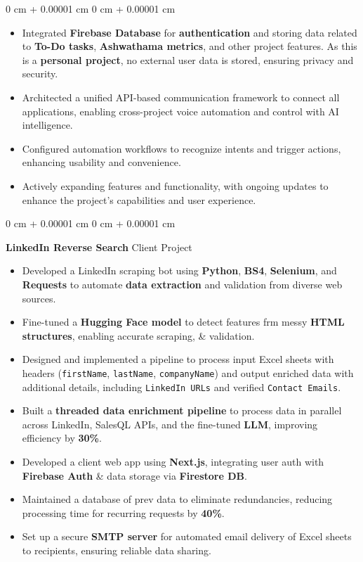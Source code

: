 \documentclass[10pt, letterpaper]{article}
\newenvironment{highlights}{
    \begin{itemize}[
        topsep=0.10 cm,
        parsep=0.10 cm,
        partopsep=0pt,
        itemsep=0pt,
        leftmargin=0 cm + 10pt
    ]
}{
    \end{itemize}
} %
\newenvironment{onecolentry}{
    \begin{adjustwidth}{
        0 cm + 0.00001 cm
    }{
        0 cm + 0.00001 cm
    }
}{
    \end{adjustwidth}
} %
\begin{document}
\begin{onecolentry}
\begin{highlights}
		\item Integrated \textbf{Firebase Database} for \textbf{authentication} and storing data related to \textbf{To-Do tasks}, \textbf{Ashwathama metrics}, and other project features. As this is a \textbf{personal project}, no external user data is stored, ensuring privacy and security.
		\item Architected a unified API-based communication framework to connect all applications, enabling cross-project voice automation and control with AI intelligence.
		\item Configured automation workflows to recognize intents and trigger actions, enhancing usability and convenience.
		\item Actively expanding features and functionality, with ongoing updates to enhance the project's capabilities and user experience.
	\end{highlights}
\end{onecolentry}

\vspace{0.15 cm}

\begin{onecolentry}
	\textbf{LinkedIn Reverse Search} \hfill Client Project
	\begin{highlights}
		\item Developed a LinkedIn scraping bot using \textbf{Python}, \textbf{BS4}, \textbf{Selenium}, and \textbf{Requests} to automate \textbf{data extraction} and validation from diverse web sources.
		\item Fine-tuned a \textbf{Hugging Face model} to detect features frm messy \textbf{HTML structures}, enabling accurate scraping, \& validation.
		\item Designed and implemented a pipeline to process input Excel sheets with headers (\texttt{firstName}, \texttt{lastName}, \texttt{companyName}) and output enriched data with additional details, including \texttt{LinkedIn URLs} and verified \texttt{Contact Emails}.
		\item Built a \textbf{threaded data enrichment pipeline} to process data in parallel across LinkedIn, SalesQL APIs, and the fine-tuned \textbf{LLM}, improving efficiency by \textbf{30\%}.
		\item Developed a client web app using \textbf{Next.js}, integrating user auth with \textbf{Firebase Auth} \& data storage via \textbf{Firestore DB}.
		\item Maintained a database of prev data to eliminate redundancies, reducing processing time for recurring requests by \textbf{40\%}.
		\item Set up a secure \textbf{SMTP server} for automated email delivery of Excel sheets to recipients, ensuring reliable data sharing.
	\end{highlights}
\end{onecolentry}
\end{document}
